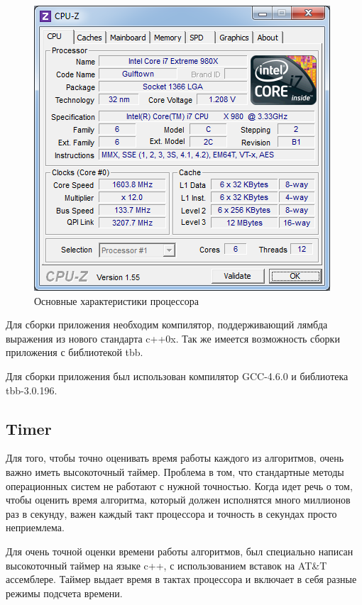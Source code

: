 \documentclass[12pt, a4paper, utf8]{article}
\begin{document}
\begin{figure}[h]
\centering
\includegraphics[scale=1]{imgs/cpu-z.png}
\caption{Основные характеристики процессора}\label{fig:cpuz}
\end{figure}



Для сборки приложения необходим компилятор, поддерживающий лямбда выражения из нового стандарта c++0x. Так же имеется возможность сборки приложения с библиотекой tbb. 

Для сборки приложения был использован компилятор GCC-4.6.0 и библиотека tbb-3.0.196.

\subsection{Timer}
Для того, чтобы точно оценивать время работы каждого из алгоритмов, очень важно иметь высокоточный таймер. Проблема в том, что стандартные методы операционных систем не работают с нужной точностью. Когда идет речь о том, чтобы оценить время алгоритма, который должен исполнятся много миллионов раз в секунду, важен каждый такт процессора и точность в секундах просто неприемлема.

Для очень точной оценки времени работы алгоритмов, был специально написан высокоточный таймер на языке c++, с использованием вставок на AT\&T ассемблере.
Таймер выдает время в тактах процессора и включает в себя разные режимы подсчета времени.

\end{document}
